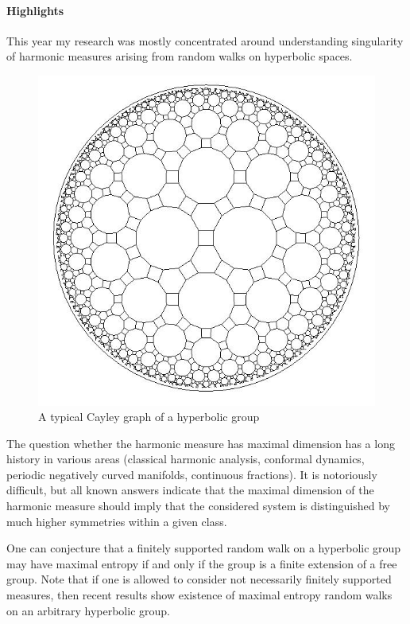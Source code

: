 \paragraph{Highlights}

This year my research was mostly concentrated around understanding
singularity of harmonic measures arising from random walks on
hyperbolic spaces.

\begin{figure}[ht]
  \begin{center}
    \includegraphics[width=\hsize]{Kaimanovich/profkaimanovich-fig1.png}
    \caption{ A typical Cayley graph of a hyperbolic group}\label{fig:profkaimanovich1}
   \end{center}
\end{figure}

The question whether the harmonic measure has maximal dimension has
a long history in various areas (classical harmonic analysis,
conformal dynamics, periodic negatively curved manifolds, continuous
fractions). It is notoriously difficult, but all known answers
indicate that the maximal dimension of the harmonic measure should
imply that the considered system is distinguished by much higher
symmetries within a given class.

One can conjecture that a finitely supported random walk on a
hyperbolic group may have maximal entropy if and only if the group
is a finite extension of a free group. Note that if one is allowed
to consider not necessarily finitely supported measures, then recent
results show existence of maximal entropy random walks on an
arbitrary hyperbolic group.

